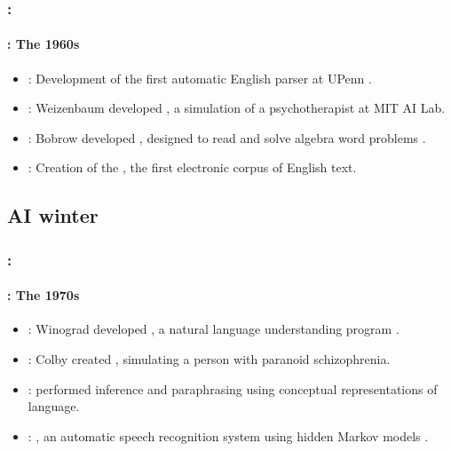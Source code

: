 \documentclass[xcolor=table]{beamer}
\begin{document}
\begin{frame}
	\frametitle{\insertshortsubtitle: \insertsection}
	\framesubtitle{\insertsubsection: The 1960s}

	\begin{itemize}
		\item {}: Development of the first automatic English parser at UPenn \cite{1961-joshi,1962-harris}.
		\item {}: Weizenbaum developed , a simulation of a psychotherapist at MIT AI Lab.
		\item {}: Bobrow developed , designed to read and solve algebra word problems \cite{1964-bobrow}.
		\item {}: Creation of the , the first electronic corpus of English text.
	\end{itemize}

\end{frame}

\subsection{AI winter}

\begin{frame}
	\frametitle{\insertshortsubtitle: \insertsection}
	\framesubtitle{\insertsubsection: The 1970s}

	\begin{itemize}
		\item {}: Winograd developed , a natural language understanding program \cite{1971-winograd}.
		\item {}: Colby created , simulating a person with paranoid schizophrenia.
		\item {}:  performed inference and paraphrasing using conceptual representations of language.
		\item {}: , an automatic speech recognition system using hidden Markov models \cite{1975-baker}.
	\end{itemize}

\end{frame}
\end{document}
